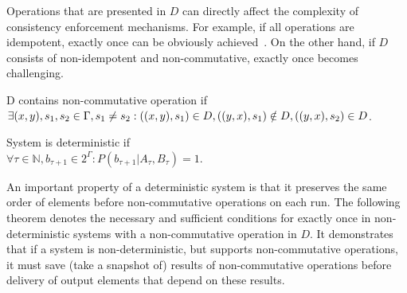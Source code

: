 Operations that are presented in $D$ can directly affect the complexity of consistency enforcement mechanisms. For example, if all operations are idempotent, exactly once can be obviously achieved~\cite{Akidau:2013:MFS:2536222.2536229}. On the other hand, if $D$ consists of non-idempotent and non-commutative, exactly once becomes challenging.

\begin{definition}{D contains non-commutative operation}
if\\ 
$\exists (x,y), s_1, s_2 \in \Gamma, s_1 \neq s_2: \\ ((x,y),s_1)\in D, \\ ((y,x),s_1)\notin D, \\ ((y,x),s_2)\in D$.
\end{definition}

\begin{definition}{System is deterministic}
if\\ 
$\forall{\tau\in{\mathbb{N}}, b_{\tau+1}\in{2^{\Gamma}}}:P(b_{\tau+1}|A_{\tau},B_\tau)=1$.
\end{definition}

An important property of a deterministic system is that it preserves the same order of elements before non-commutative operations on each run. The following theorem denotes the necessary and sufficient conditions for exactly once in non-deterministic systems with a non-commutative operation in $D$. It demonstrates that if a system is non-deterministic, but supports non-commutative operations, it must save (take a snapshot of) results of non-commutative operations before delivery of output elements that depend on these results.

